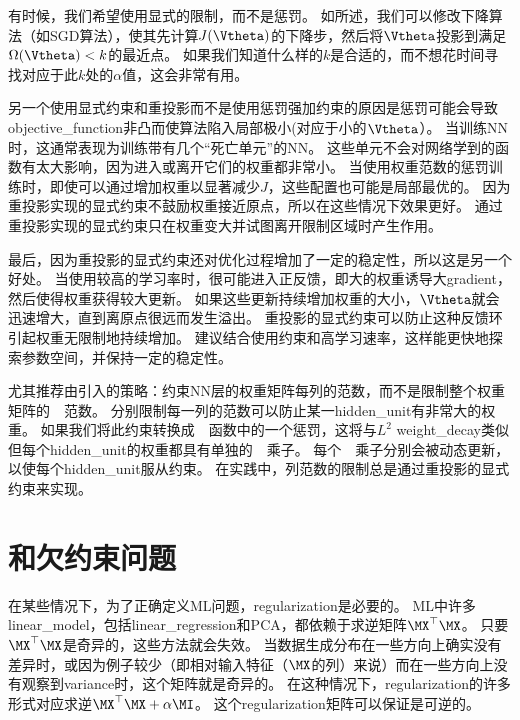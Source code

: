 
有时候，我们希望使用显式的限制，而不是惩罚。
如所述，我们可以修改下降算法（如\gls{SGD}算法），使其先计算$J(\Vtheta)$的下降步，然后将$\Vtheta$投影到满足$\Omega(\Vtheta) < k$的最近点。
如果我们知道什么样的$k$是合适的，而不想花时间寻找对应于此$k$处的$\alpha$值，这会非常有用。

另一个使用显式约束和重投影而不是使用惩罚强加约束的原因是惩罚可能会导致\gls{objective_function}非凸而使算法陷入局部极小(对应于小的$\Vtheta$）。
当训练\gls{NN}时，这通常表现为训练带有几个``死亡单元''的\gls{NN}。
这些单元不会对网络学到的函数有太大影响，因为进入或离开它们的权重都非常小。
当使用权重范数的惩罚训练时，即使可以通过增加权重以显著减少$J$，这些配置也可能是局部最优的。
因为重投影实现的显式约束不鼓励权重接近原点，所以在这些情况下效果更好。
通过重投影实现的显式约束只在权重变大并试图离开限制区域时产生作用。

最后，因为重投影的显式约束还对优化过程增加了一定的稳定性，所以这是另一个好处。
当使用较高的学习率时，很可能进入正反馈，即大的权重诱导大\gls{gradient}，然后使得权重获得较大更新。
如果这些更新持续增加权重的大小，$\Vtheta$就会迅速增大，直到离原点很远而发生溢出。
重投影的显式约束可以防止这种反馈环引起权重无限制地持续增加。
\cite{Hinton-et-al-2012c}建议结合使用约束和高学习速率，这样能更快地探索参数空间，并保持一定的稳定性。


\cite{Hinton-et-al-2012c}尤其推荐由\cite{Srebro-Shraibman-2005}引入的策略：约束\gls{NN}层的权重矩阵每列的范数，而不是限制整个权重矩阵的~~范数。
分别限制每一列的范数可以防止某一\gls{hidden_unit}有非常大的权重。
如果我们将此约束转换成~~函数中的一个惩罚，这将与$L^2$ \gls{weight_decay}类似但每个\gls{hidden_unit}的权重都具有单独的~~乘子。
每个~~乘子分别会被动态更新，以使每个\gls{hidden_unit}服从约束。
在实践中，列范数的限制总是通过重投影的显式约束来实现。

\section{和欠约束问题}
\label{sec:regularization_and_under_constrained_problems}
在某些情况下，为了正确定义\gls{ML}问题，\gls{regularization}是必要的。
\gls{ML}中许多\gls{linear_model}，包括\gls{linear_regression}和PCA，都依赖于求逆矩阵$\MX^\top\MX$。
只要$\MX^\top\MX$是奇异的，这些方法就会失效。
当数据生成分布在一些方向上确实没有差异时，或因为例子较少（即相对输入特征（$\MX$的列）来说）而在一些方向上没有观察到\gls{variance}时，这个矩阵就是奇异的。
在这种情况下，\gls{regularization}的许多形式对应求逆$\MX^\top\MX + \alpha \MI$。
这个\gls{regularization}矩阵可以保证是可逆的。

